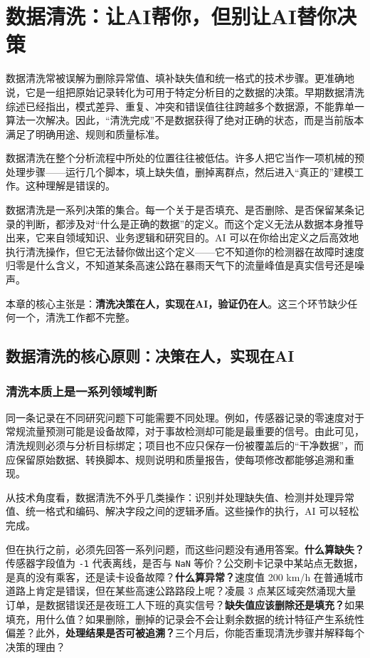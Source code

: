﻿\chapter{数据清洗：让AI帮你，但别让AI替你决策}

数据清洗常被误解为删除异常值、填补缺失值和统一格式的技术步骤。更准确地说，它是一组把原始记录转化为可用于特定分析目的之数据的决策。早期数据清洗综述已经指出，模式差异、重复、冲突和错误值往往跨越多个数据源，不能靠单一算法一次解决\cite{rahm2000data}。因此，“清洗完成”不是数据获得了绝对正确的状态，而是当前版本满足了明确用途、规则和质量标准。

数据清洗在整个分析流程中所处的位置往往被低估。许多人把它当作一项机械的预处理步骤——运行几个脚本，填上缺失值，删掉离群点，然后进入“真正的”建模工作。这种理解是错误的。

数据清洗是一系列决策的集合。每一个关于是否填充、是否删除、是否保留某条记录的判断，都涉及对“什么是正确的数据”的定义。而这个定义无法从数据本身推导出来，它来自领域知识、业务逻辑和研究目的。AI 可以在你给出定义之后高效地执行清洗操作，但它无法替你做出这个定义——它不知道你的检测器在故障时速度归零是什么含义，不知道某条高速公路在暴雨天气下的流量峰值是真实信号还是噪声。

本章的核心主张是：\textbf{清洗决策在人，实现在AI，验证仍在人}。这三个环节缺少任何一个，清洗工作都不完整。

\section{数据清洗的核心原则：决策在人，实现在AI}

\subsection{清洗本质上是一系列领域判断}

同一条记录在不同研究问题下可能需要不同处理。例如，传感器记录的零速度对于常规流量预测可能是设备故障，对于事故检测却可能是最重要的信号。由此可见，清洗规则必须与分析目标绑定；项目也不应只保存一份被覆盖后的“干净数据”，而应保留原始数据、转换脚本、规则说明和质量报告，使每项修改都能够追溯和重现。

从技术角度看，数据清洗不外乎几类操作：识别并处理缺失值、检测并处理异常值、统一格式和编码、解决字段之间的逻辑矛盾。这些操作的执行，AI 可以轻松完成。

但在执行之前，必须先回答一系列问题，而这些问题没有通用答案。\textbf{什么算缺失？}传感器字段值为 \texttt{-1} 代表离线，是否与 \texttt{NaN} 等价？公交刷卡记录中某站点无数据，是真的没有乘客，还是读卡设备故障？\textbf{什么算异常？}速度值 200 km/h 在普通城市道路上肯定是错误，但在某些高速公路路段上呢？凌晨 3 点某区域突然涌现大量订单，是数据错误还是夜班工人下班的真实信号？\textbf{缺失值应该删除还是填充？}如果填充，用什么值？如果删除，删掉的记录会不会让剩余数据的统计特征产生系统性偏差？此外，\textbf{处理结果是否可被追溯？}三个月后，你能否重现清洗步骤并解释每个决策的理由？

